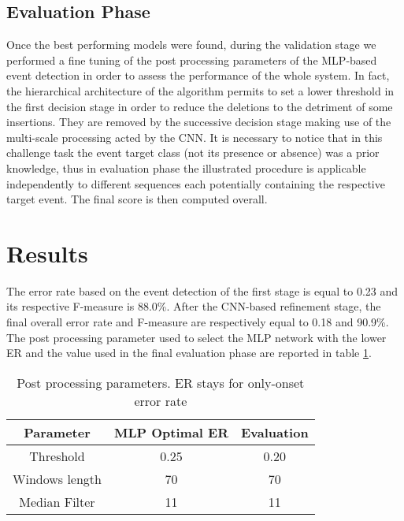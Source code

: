 \documentclass{article}
\begin{document}
\begin{sloppy}
\subsection{Evaluation Phase}
Once the best performing models were found, during the validation stage we performed a fine tuning of the post processing parameters of the MLP-based event detection in order to assess the performance of the whole system. In fact, the hierarchical architecture of the algorithm permits to set a lower threshold in the first decision stage in order to reduce the deletions to the detriment of some insertions. They are removed by the successive decision stage making use of the multi-scale processing acted by the CNN. 
It is necessary to notice that in this challenge task the event target class (not its presence or absence) was a prior knowledge, thus in evaluation phase the illustrated procedure is applicable independently to different sequences each potentially containing the respective target event. The final score is then computed overall.

\section{Results}
\label{sec:results}
The error rate based on the event detection of the first stage is equal to 0.23 and its respective F-measure is 88.0\%. 
After the CNN-based refinement stage, the final overall error rate and F-measure are respectively equal to 0.18 and 90.9\%. 
The post processing parameter used to select the MLP network with the lower ER and the value used in the final evaluation phase are reported in table \ref{tbl:post-proc-params}.

\begin{table}[t]
  \caption{Post processing parameters. ER stays for only-onset error rate}
  \label{tbl:post-proc-params}
  \centering
  \footnotesize
  \begin{tabular} {| c | c | c |}
    \hline
    Parameter     & MLP Optimal ER &  Evaluation\\  
    \hline
    \hline                                     
    Threshold  & 0.25 & 0.20\\
    \hline                                     
    Windows length & 70 & 70\\
    \hline
    Median Filter & 11 & 11\\
    \hline                                       
  \end{tabular}
\end{table}



\end{sloppy}
\end{document}
